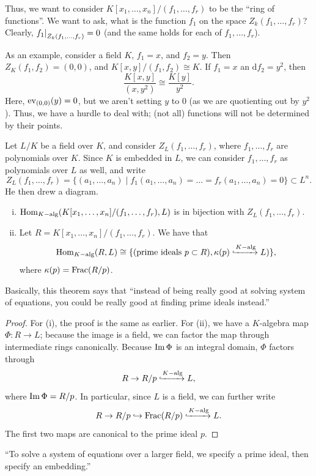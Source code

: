 Thus, we want to consider $K[x_1, \dots, x_n]/(f_1, \dots, f_r)$ to be the ``ring of functions''. We want to ask, what is the function $f_1$ on the space $Z_k(f_1, \dots, f_r)$? Clearly, $\restr{f_1}{Z_k(f_1, \dots, f_r)} = 0$ (and the same holds for each of $f_1, \dots, f_r$).

As an example, consider a field $K$, $f_1 = x$, and $f_2 = y$. Then $Z_K(f_1, f_2) = (0, 0)$, and $K[x, y]/(f_1, f_2) \cong K$. If $f_1 = x$ an d$f_2 = y^2$, then
\[ \frac{K[x, y]}{(x, y^2)} \cong \frac{K[y]}{y^2}. \]
Here, $\operatorname{ev}_{(0, 0)}(y) = 0$, but we aren't setting $y$ to $0$ (as we are quotienting out by $y^2$). Thus, we have a hurdle to deal with; (not all) functions will not be determined by their points.

Let $L/K$ be a field over $K$, and consider $Z_L(f_1, \dots, f_r)$, where $f_1, \dots, f_r$ are polynomials over $K$. Since $K$ is embedded in $L$, we can consider $f_1, \dots, f_r$ as polynomials over $L$ as well, and write
\[ Z_L(f_1, \dots, f_r) = \{(a_1, \dots, a_n) \mid f_1(a_1, \dots, a_n) = \dots = f_r(a_1, \dots, a_n) = 0\} \subset L^n. \]
{\color{airforceblue} He then drew a diagram.}

\newpage
\begin{theorem}
    \begin{enumerate}[(i)]
        \item $\operatorname{Hom}_{K-\operatorname{alg}}(K[x_1, \dots, x_n]/(f_1, \dots, f_r), L)$ is in bijection with $Z_L(f_1, \dots, f_r)$.
        \item Let $R = K[x_1, \dots, x_n]/(f_1, \dots, f_r)$. We have that
        \[ \operatorname{Hom}_{K-\operatorname{alg}}(R, L) \cong \{(\text{prime ideals } p \subset R), \kappa(p) \xhookrightarrow[]{K-\operatorname{alg}} L)\}, \]
        where $\kappa(p) = \operatorname{Frac}(R/p)$.
    \end{enumerate}
\end{theorem}
Basically, this theorem says that ``instead of being really good at solving system of equations, you could be really good at finding prime ideals instead.''
\begin{proof}
    For (i), the proof is the same as earlier. For (ii), we have a $K$-algebra map $\Phi \colon R \to L$; because the image is a field, we can factor the map through intermediate rings canonically. Because $\operatorname{Im} \Phi$ is an integral domain, $\Phi$ factors through
    \[ R \to R/p \xhookrightarrow[]{K-\operatorname{alg}} L, \]
    where $\operatorname{Im} \Phi = R/p$. In particular, since $L$ is a field, we can further write
    \[ R \to R/p \hookrightarrow \operatorname{Frac}(R/p) \xhookrightarrow[]{K-\operatorname{alg}} L. \]
    The first two maps are canonical to the prime ideal $p$.
\end{proof}
``To solve a system of equations over a larger field, we specify a prime ideal, then specify an embedding.''

